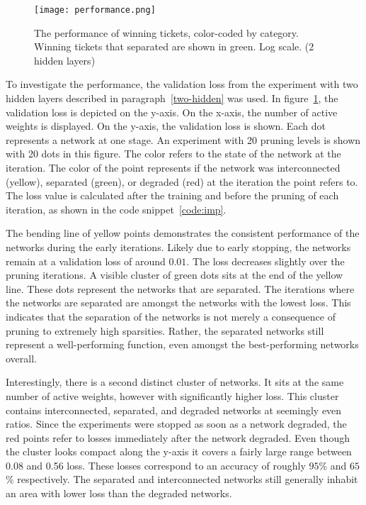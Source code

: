 \begin{figure}[t]
    \centering
    \texttt{[image: performance.png]}
    \caption[Performance of winning tickets]{
        The performance of winning tickets, color-coded by category.
        Winning tickets that separated are shown in green.
        Log scale. (2 hidden layers)
    }\label{fig:performance}
\end{figure}

To investigate the performance, the validation loss from the experiment with two hidden layers described in paragraph~\ref{two-hidden} was used.
In figure~\ref{fig:performance}, the validation loss is depicted on the y-axis.
On the x-axis, the number of active weights is displayed.
On the y-axis, the validation loss is shown.
Each dot represents a network at one stage.
An experiment with 20 pruning levels is shown with 20 dots in this figure.
The color refers to the state of the network at the iteration.
The color of the point represents if the network was interconnected (yellow), separated (green), or degraded (red) at the iteration the point refers to.
The loss value is calculated after the training and before the pruning of each iteration, as shown in the code snippet~\ref{code:imp}.

The bending line of yellow points demonstrates the consistent performance of the networks during the early iterations.
Likely due to early stopping, the networks remain at a validation loss of around $0.01$.
The loss decreases slightly over the pruning iterations.
A visible cluster of green dots sits at the end of the yellow line.
These dots represent the networks that are separated.
The iterations where the networks are separated are amongst the networks with the lowest loss.
This indicates that the separation of the networks is not merely a consequence of pruning to extremely high sparsities.
Rather, the separated networks still represent a well-performing function, even amongst the best-performing networks overall.

Interestingly, there is a second distinct cluster of networks.
It sits at the same number of active weights, however with significantly higher loss.
This cluster contains interconnected, separated, and degraded networks at seemingly even ratios.
Since the experiments were stopped as soon as a network degraded, the red points refer to losses immediately after the network degraded.
Even though the cluster looks compact along the y-axis it covers a fairly large range between 0.08 and 0.56 loss. These losses correspond to an accuracy of roughly $95$\% and $65$\% respectively.
The separated and interconnected networks still generally inhabit an area with lower loss than the degraded networks.

